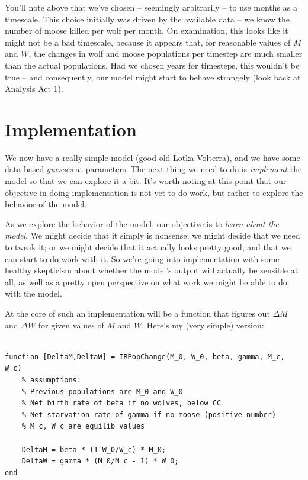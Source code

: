 You'll note above that we've chosen -- seemingly arbitrarily -- to use months as a timescale.  This choice initially was driven by the available data -- we know the number of moose killed per wolf per month.  On examination, this looks like it might not be a bad timescale, because it appears that, for reasonable values of $M$ and $W$, the changes in wolf and moose populations per timestep are much smaller than the actual populations.  Had we chosen years for timesteps, this wouldn't be true -- and consequently, our model might start to behave strangely (look back at Analysis Act 1).

\section{Implementation}

We now have a really simple model (good old Lotka-Volterra), and we have some data-based {\it guesses} at parameters.  The next thing we need to do is {\it implement} the model so that we can explore it a bit.  It's worth noting at this point that our objective in doing implementation is not yet to do work, but rather to explore the behavior of the model.   

As we explore the behavior of the model, our objective is to {\it learn about the model}.  We might 
decide that it simply is nonsense; we might decide that we need to tweak it; or we might decide that it 
actually looks pretty good, and that we can start to do work with it.  So we're going into implementation 
with some healthy skepticism about whether the model's output will actually be sensible at all, as well
as a pretty open perspective on what work we might be able to do with the model.

At the core of such an implementation will be a function that figures out $\Delta M$ and $\Delta W$ for given values of $M$ and $W$.  Here's my (very simple) version:

\begin{verbatim}

function [DeltaM,DeltaW] = IRPopChange(M_0, W_0, beta, gamma, M_c, W_c)
    % assumptions:
    % Previous populations are M_0 and W_0
    % Net birth rate of beta if no wolves, below CC
    % Net starvation rate of gamma if no moose (positive number)
    % M_c, W_c are equilib values
 
    DeltaM = beta * (1-W_0/W_c) * M_0;
    DeltaW = gamma * (M_0/M_c - 1) * W_0;
end
 
\end{verbatim}

